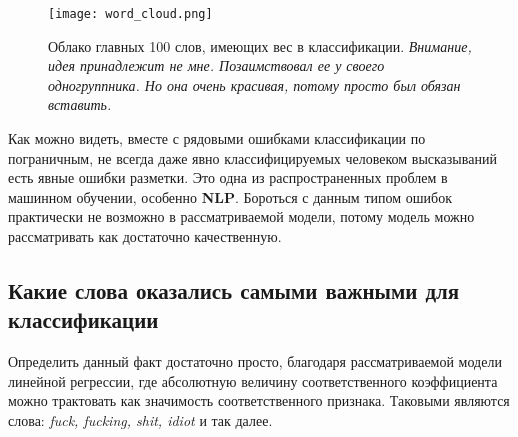 \documentclass{article}
\begin{document}
\begin{figure}[b]
    \centerline{\texttt{[image: word\_cloud.png]}}
    \caption{Облако главных 100 слов, имеющих вес в классификации. \textit{Внимание, идея принадлежит не мне. Позаимствовал ее у своего одногруппника. Но она очень красивая, потому просто был обязан вставить.}}
    \label{fig:sgdc_loss_for_alphas}
\end{figure}

        \noindent Как можно видеть, вместе с рядовыми ошибками классификации по пограничным, не всегда даже явно классифицируемых человеком высказываний есть явные ошибки разметки. Это одна из распространенных проблем в машинном обучении, особенно \textbf{NLP}. Бороться с данным типом ошибок практически не возможно в рассматриваемой модели, потому модель можно рассматривать как достаточно качественную.

        \subsection{Какие слова оказались самыми важными для классификации}

        Определить данный факт достаточно просто, благодаря рассматриваемой модели линейной регрессии, где абсолютную величину соответственного коэффициента можно трактовать как значимость соответственного признака. Таковыми являются слова: \textit{fuck, fucking, shit, idiot} и так далее.
\end{document}
